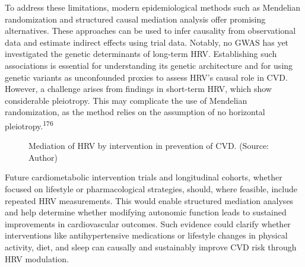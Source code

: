 \documentclass[
  letterpaper,
  headsepline=true,
  open=any]{scrbook}
\begin{document}
To address these limitations, modern epidemiological methods such as
Mendelian randomization and structured causal mediation analysis offer
promising alternatives. These approaches can be used to infer causality
from observational data and estimate indirect effects using trial data.
Notably, no GWAS has yet investigated the genetic determinants of
long-term HRV. Establishing such associations is essential for
understanding its genetic architecture and for using genetic variants as
unconfounded proxies to assess HRV's causal role in CVD. However, a
challenge arises from findings in short-term HRV, which show
considerable pleiotropy. This may complicate the use of Mendelian
randomization, as the method relies on the assumption of no horizontal
pleiotropy.\textsuperscript{176}

\begin{figure}

\begin{minipage}[t]{\linewidth}

{\centering 


\caption{Mediation of HRV by intervention in prevention of CVD. (Source:
Author)}

}

\end{minipage}%

\end{figure}

Future cardiometabolic intervention trials and longitudinal cohorts,
whether focused on lifestyle or pharmacological strategies, should,
where feasible, include repeated HRV measurements. This would enable
structured mediation analyses and help determine whether modifying
autonomic function leads to sustained improvements in cardiovascular
outcomes. Such evidence could clarify whether interventions like
antihypertensive medications or lifestyle changes in physical activity,
diet, and sleep can causally and sustainably improve CVD risk through
HRV modulation.
\end{document}
